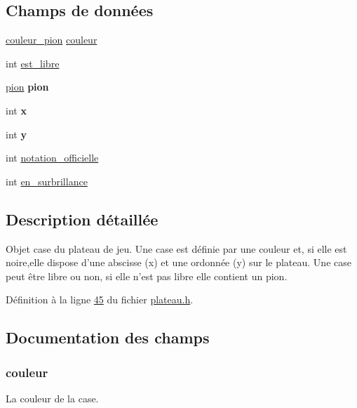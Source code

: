 \subsection*{Champs de données}
\begin{DoxyCompactItemize}
\item 
\hyperlink{plateau_8h_a8282be6127518547fa916dd6cfef17cb}{couleur\_\-pion} \hyperlink{structcase__plateau_a057f95a41503a890f27c651969ffac8d}{couleur}
\item 
int \hyperlink{structcase__plateau_a173f25d2fd7c653d77ca8174ba4f636d}{est\_\-libre}
\item 
\hypertarget{structcase__plateau_a8bae207c875a01f3370c58bd07b8fa82}{
\hyperlink{structpion}{pion} {\bfseries pion}}
\label{structcase__plateau_a8bae207c875a01f3370c58bd07b8fa82}

\item 
\hypertarget{structcase__plateau_a6150e0515f7202e2fb518f7206ed97dc}{
int {\bfseries x}}
\label{structcase__plateau_a6150e0515f7202e2fb518f7206ed97dc}

\item 
\hypertarget{structcase__plateau_a0a2f84ed7838f07779ae24c5a9086d33}{
int {\bfseries y}}
\label{structcase__plateau_a0a2f84ed7838f07779ae24c5a9086d33}

\item 
int \hyperlink{structcase__plateau_ad510581b324604a9cf685cbb769a421a}{notation\_\-officielle}
\item 
int \hyperlink{structcase__plateau_ae49bb71ca6836b02fd9efa3c1fa64405}{en\_\-surbrillance}
\end{DoxyCompactItemize}


\subsection{Description détaillée}
Objet case du plateau de jeu. Une case est définie par une couleur et, si elle est noire,elle dispose d'une abscisse (x) et une ordonnée (y) sur le plateau. Une case peut être libre ou non, si elle n'est pas libre elle contient un pion. 

Définition à la ligne \hyperlink{plateau_8h_source_l00045}{45} du fichier \hyperlink{plateau_8h_source}{plateau.h}.



\subsection{Documentation des champs}
\hypertarget{structcase__plateau_a057f95a41503a890f27c651969ffac8d}{
\subsubsection[{couleur}]{ {\bf couleur}}}
\label{structcase__plateau_a057f95a41503a890f27c651969ffac8d}
La couleur de la case. 

